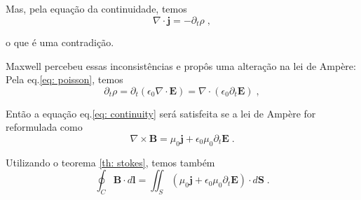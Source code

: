 \noindent Mas, pela equação da continuidade, temos
\begin{equation}
    \nabla \cdot \mathbf j = - \partial_t \rho \;,
    \label{eq: continuity}
\end{equation}

\noindent o que é uma contradição.

Maxwell percebeu essas inconsistências e propôs uma alteração na lei de Ampère:
Pela eq.\eqref{eq: poisson}, temos
\begin{equation}
    \partial_t \rho = \partial_t (\epsilon_0 \nabla \cdot \mathbf E ) = \nabla \cdot (\epsilon_0 \partial_t \mathbf E) \;,
\end{equation}

\noindent Então a equação eq.\eqref{eq: continuity} será satisfeita se a lei de Ampère for reformulada como
\begin{equation}
    \nabla \times \mathbf B = \mu_0 \mathbf j + \epsilon_0 \mu_0 \partial_t \mathbf E \;.
    \label{eq: dif_amperemaxwell}
\end{equation}

\noindent Utilizando o teorema \ref{th: stokes}, temos também
\begin{equation}
    \oint_C \mathbf B \cdot d\mathbf l = \iint_S \left( \mu_0\mathbf j + \epsilon_0\mu_0\partial_t\mathbf E \right) \cdot d\mathbf S \;.
    \label{eq: int_amperemaxwell}
\end{equation}

